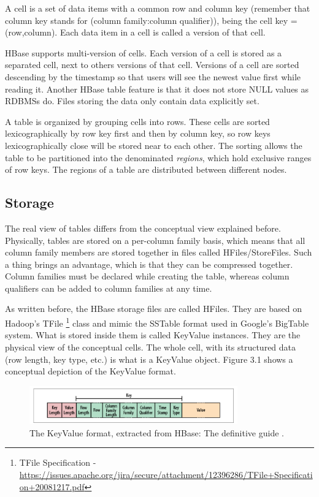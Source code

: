 A cell is a set of data items with a common row and column key (remember that column key stands for (column family:column qualifier)), being the cell key = (row,column). Each data item in a cell is called a version of that cell.
\par
HBase supports multi-version of cells. Each version of a cell is stored as a separated cell, next to others versions of that cell. Versions of a cell are sorted descending by the timestamp so that users will see the newest value first while reading it.
Another HBase table feature is that it does not store NULL values as RDBMSs do. Files storing the data only contain data explicitly set.
\par
A table is organized by grouping cells into rows. These cells are sorted lexicographically by row key first and then by column key, so row keys lexicographically close will be stored near to each other. The sorting allows the table to be partitioned into the denominated \textit{regions}, which hold exclusive ranges of row keys. The regions of a table are distributed between different nodes.

\subsection {Storage}

The real view of tables differs from the conceptual view explained before. Physically, tables are stored on a per-column family basis, which means that all column family members are stored together in files called HFiles/StoreFiles. Such a thing brings an advantage, which is that they can be compressed together. Column families must be declared while creating the table, whereas column qualifiers can be added to column families at any time.
\par
As written before, the HBase storage files are called HFiles. They are based on Hadoop's TFile \footnote{{TF}ile {S}pecification - \url{https://issues.apache.org/jira/secure/attachment/12396286/TFile+Specification+20081217.pdf}} class and mimic the SSTable format used in Google's BigTable system. What is stored inside them is called KeyValue instances. They are the physical view of the conceptual cells. The whole cell, with its structured data (row length, key type, etc.) is what is a KeyValue object. Figure 3.1 shows a conceptual depiction of the KeyValue format.
\par

\begin{figure}[htb]
\centering
\includegraphics[width=0.8\textwidth]{./images/keyvalue.png}
\caption{The KeyValue format, extracted from HBase: The definitive guide \cite{george2011hbase}.} \label{fig:keyvalue}
\end{figure}


